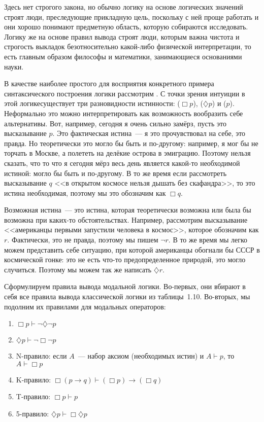 Здесь нет строгого закона, но обычно логику на основе логических значений строят люди, преследующие прикладную цель, поскольку с ней проще работать и они хорошо понимают предметную область, которую собираются исследовать. Логику же на основе правил вывода строят люди, которым важна чистота и строгость выкладок безотносительно какой-либо физической интерпретации, то есть главным образом философы и математики, занимающиеся основаниями науки.

В качестве наиболее простого для восприятия конкретного примера синтаксического построения логики рассмотрим . С точки зрения интуиции в этой логикесуществует три разновидности истинности:  ($\Box p$),  ($\diamondsuit p$) и  ($p$). Неформально это можно интерпретировать как возможность вообразить себе альтернативы. Вот, например, сегодня я очень сильно замёрз, пусть это высказывание $p$. Это фактическая истина~--- я это прочувствовал на себе, это правда. Но теоретически это могло бы быть и по-другому: например, я мог бы не торчать в Москве, а полететь на делёкие острова в эмиграцию. Поэтому нельзя сказать, что то что я сегодня мёрз весь день является какой-то необходимой истиной: могло бы быть и по-другому. В то же время если рассмотреть высказывание $q$ <<в открытом космосе нельзя дышать без скафандра>>, то это истина необходимая, поэтому мы это обозначим как $\Box q$.

Возможная истина~--- это истина, которая теоретически возможна или была бы возможна при каких-то обстоятельствах. Например, рассмотрим высказывание <<американцы первыми запустили человека в космос>>, которое обозначим как $r$. Фактически, это не правда, поэтому мы пишем $\neg r$. В то же время мы легко можем представить себе ситуацию, при которой американцы обогнали бы СССР в космической гонке: это не есть что-то предопределенное природой, это могло случиться. Поэтому мы можем так же написать $\diamondsuit r$. 

Сформулируем правила вывода модальной логики. Во-первых, они вбирают в себя все правила вывода классической логики из таблицы~1.10. Во-вторых, мы подолним их правилами для модальных операторов:

\begin{enumerate}
\item $\Box p \vdash \neg \diamondsuit \neg p$
\item $\diamondsuit p \vdash \neg \Box \neg p$
\item N-правило: если $A$~--- набор аксиом (необходимых истин) и $A\vdash p$, то $A\vdash \Box p$
\item K-правило: $\Box (p\to q) \vdash (\Box p) \to (\Box q)$
\item T-правило: $\Box p \vdash p$
\item 5-правило: $\diamondsuit p \vdash \Box \diamondsuit p$
\end{enumerate}

